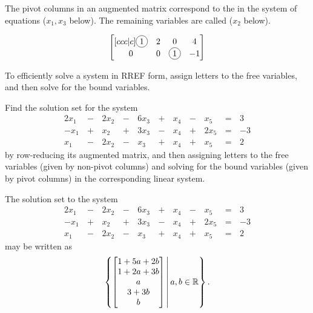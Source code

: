 \begin{applicationActivities}
\begin{definition}
\vspace{0.2in}

The pivot columns in an augmented matrix correspond to the
 in the system of equations (\(x_1,x_3\) below).
The remaining variables are called  (\(x_2\) below).

\[
  \begin{bmatrix}[ccc|c]
    \circledNumber{1} & 2 & 0 & 4 \\
    0 & 0 & \circledNumber{1} & -1
  \end{bmatrix}
\]

To efficiently solve a system in RREF form, assign letters to the free
variables, and then solve for the bound variables.
\end{definition}

\begin{activity}{10}
Find the solution set for the system
\begin{alignat*}{6}
2x_1&\,-\,&2x_2&\,-\,&6x_3&\,+\,&x_4&\,-\,&x_5&\,=\,&3 \\
-x_1&\,+\,&x_2&\,+\,&3x_3&\,-\,&x_4&\,+\,&2x_5 &\,=\,& -3 \\
x_1&\,-\,&2x_2&\,-\,&x_3&\,+\,&x_4&\,+\,&x_5 &\,=\,& 2
\end{alignat*}
by row-reducing its augmented matrix, and then
assigning letters to the free variables (given by non-pivot columns)
and solving for the bound variables (given by pivot columns) in
the corresponding linear system.
\end{activity}

\begin{observation}
The solution set to the system
\begin{alignat*}{6}
2x_1&\,-\,&2x_2&\,-\,&6x_3&\,+\,&x_4&\,-\,&x_5&\,=\,&3 \\
-x_1&\,+\,&x_2&\,+\,&3x_3&\,-\,&x_4&\,+\,&2x_5 &\,=\,& -3 \\
x_1&\,-\,&2x_2&\,-\,&x_3&\,+\,&x_4&\,+\,&x_5 &\,=\,& 2
\end{alignat*}
may be written as
\[
  \left\{
    \begin{bmatrix}
      1+5a+2b \\
      1+2a+3b \\
      a \\
      3+3b \\
      b
    \end{bmatrix}
  \,\middle|\,
    a,b\in \mathbb{R}
  \right\}
.\]
\end{observation}


\end{applicationActivities}
